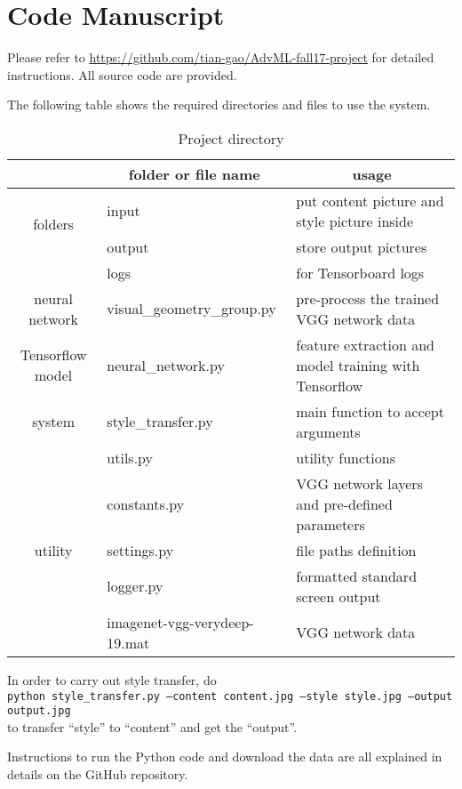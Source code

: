 \chapter{Code Manuscript}
\label{app:readme}


Please refer to \url{https://github.com/tian-gao/AdvML-fall17-project} for detailed instructions.
All source code are provided.

The following table shows the required directories and files to use the system.

	\begin{table}[!htb]
	\center
	\begin{tabular}{c|l|l}
	\hline
	& \multicolumn{1}{c|}{folder or file name} & \multicolumn{1}{c}{usage} \\ \hline
	\multirow{2}{*}{folders}
		& input & put content picture and style picture inside \\
		& output & store output pictures \\ 
		& logs & for Tensorboard logs \\ \hline
	neural network & visual\_geometry\_group.py & pre-process the trained VGG network data \\ \hline
	Tensorflow model & neural\_network.py &
		feature extraction and model training with Tensorflow \\ \hline
	system & style\_transfer.py & main function to accept arguments \\ \hline
	\multirow{5}{*}{utility}
		& utils.py & utility functions \\
		& constants.py & VGG network layers and pre-defined parameters \\
		& settings.py & file paths definition \\
		& logger.py & formatted standard screen output \\ \hline
	data & imagenet-vgg-verydeep-19.mat & VGG network data \\
	\hline
	\end{tabular}
	\caption{Project directory}
	\label{table:layers}
	\end{table}

In order to carry out style transfer, do \\
	\texttt{python style\_transfer.py --content content.jpg --style style.jpg --output output.jpg} \\
to transfer ``style'' to ``content'' and get the ``output''.


Instructions to run the Python code and download the data
are all explained in details on the GitHub repository.
